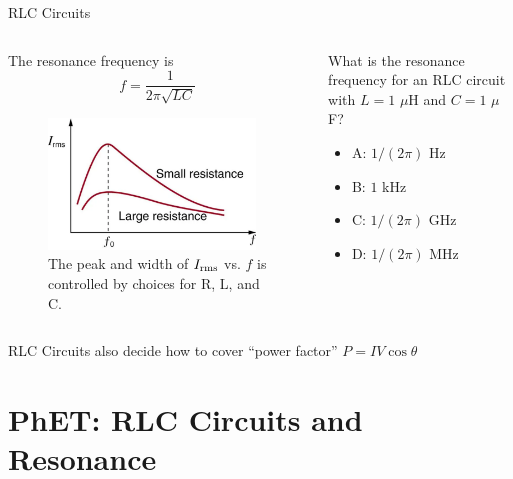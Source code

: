 \documentclass{beamer}
\begin{document}
\begin{frame}{RLC Circuits}
\begin{columns}[T]
\begin{column}{0.5\textwidth}
The resonance frequency is
\begin{equation}
f = \frac{1}{2\pi\sqrt{LC}}
\end{equation}
\begin{figure}
\centering
\includegraphics[width=0.95\textwidth]{figures/resonance.png}
\caption{\label{fig:resonance} The peak and width of $I_{\rm rms}$ vs. $f$ is controlled by choices for R, L, and C.}
\end{figure}
\end{column}
\begin{column}{0.5\textwidth}
What is the resonance frequency for an RLC circuit with $L = 1$ $\mu$H and $C = 1$ $\mu$F?
\begin{itemize}
\item A: $1/(2\pi)$ Hz
\item B: $1$ kHz
\item C: $1/(2\pi)$ GHz
\item D: $1/(2\pi)$ MHz
\end{itemize}
\end{column}
\end{columns}
\end{frame}

\begin{frame}{RLC Circuits}
also decide how to cover ``power factor'' $P = I V \cos\theta$
\end{frame}

\section{PhET: RLC Circuits and Resonance}
\end{document}

